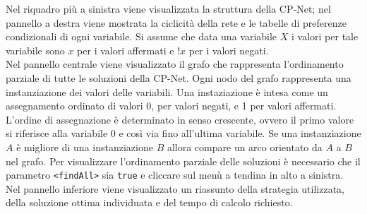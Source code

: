 \documentclass[a4paper,titlepage]{article}
\begin{document}
Nel riquadro più a sinistra viene visualizzata la struttura della CP-Net; nel pannello a destra viene mostrata la ciclicità della rete e le tabelle di preferenze condizionali di ogni variabile. Si assume che data una variabile $X$ i valori per tale variabile sono $x$ per i valori affermati e $!x$ per i valori negati.\\
Nel pannello centrale viene visualizzato il grafo che rappresenta l'ordinamento parziale di tutte le soluzioni della CP-Net. Ogni nodo del grafo rappresenta una instanziazione dei valori delle variabili. Una instaziazione è intesa come un assegnamento ordinato di valori 0, per valori negati, e 1 per valori affermati. L'ordine di assegnazione è determinato in senso crescente, ovvero il primo valore si riferisce alla variabile 0 e così via fino all'ultima variabile. Se una instanziazione $A$ è migliore di una instanziazione $B$ allora compare un arco orientato da $A$ a $B$ nel grafo. Per visualizzare l'ordinamento parziale delle soluzioni è necessario che il parametro \texttt{<findAll>} sia \texttt{true} e cliccare sul menù a tendina in alto a sinistra.\\
Nel pannello inferiore viene visualizzato un riassunto della strategia utilizzata, della soluzione ottima individuata e del tempo di calcolo richiesto.
\end{document}
